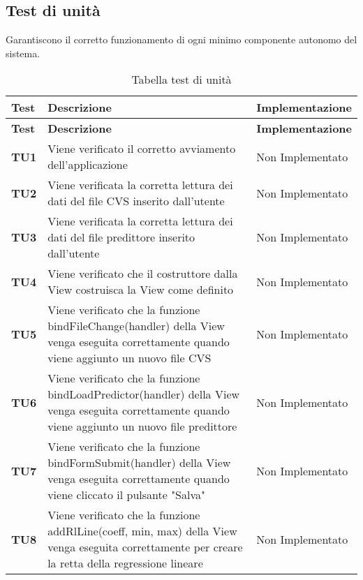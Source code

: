 \documentclass[../piano-di-qualifica.tex]{subfiles}
\begin{document}
\subsection{Test di unità}
\label{sub:test_di_unita}
Garantiscono il corretto funzionamento di ogni minimo componente autonomo del sistema.

\renewcommand{\arraystretch}{2} %
\begin{longtable}[H]{>{\centering\bfseries}m{2.5cm} >{\centering}m{7.5cm} >{\centering\arraybackslash}m{3.5cm}}
  \caption{Tabella test di unità}%
  \label{tab:tabella_test_di_unita}                                                    \\
  \rowcolor{lightgray}
  {\textbf{Test}} & {\textbf{Descrizione}} & {\textbf{Implementazione}}  \\
  \endfirsthead%
  \rowcolor{lightgray}
  {\textbf{Test}} & {\textbf{Descrizione}} & {\textbf{Implementazione}}  \\
  \endhead%
  \rowcolor{white}
  \multicolumn{3}{c}{\textit{Continua alla pagina successiva}}
  \endfoot%
  \endlastfoot%
  \textbf{TU1} & Viene verificato il corretto avviamento dell'applicazione & Non Implementato \\
  \textbf{TU2} & Viene verificata la corretta lettura dei dati del file CVS inserito dall'utente & Non Implementato \\
  \textbf{TU3} & Viene verificata la corretta lettura dei dati del file predittore inserito dall'utente & Non Implementato \\
  \textbf{TU4} & Viene verificato che il costruttore dalla View costruisca la View come definito & Non Implementato \\
  \textbf{TU5} & Viene verificato che la funzione bindFileChange(handler) della View venga eseguita correttamente quando viene aggiunto un nuovo file CVS & Non Implementato \\
  \textbf{TU6} & Viene verificato che la funzione bindLoadPredictor(handler) della View venga eseguita correttamente quando viene aggiunto un nuovo file predittore & Non Implementato \\
  \textbf{TU7} & Viene verificato che la funzione bindFormSubmit(handler) della View venga eseguita correttamente quando viene cliccato il pulsante "Salva" & Non Implementato \\
  \textbf{TU8} & Viene verificato che la funzione addRlLine(coeff, min, max) della View venga eseguita correttamente per creare la retta della regressione lineare & Non Implementato \\

\end{longtable}
\end{document}
